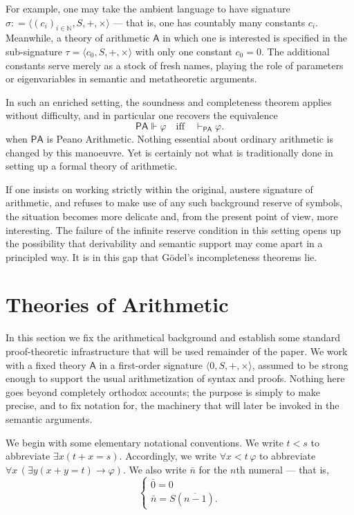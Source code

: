 \documentclass[reqno]{asl}
\newcommand{\supp}{\Vdash}
\newcommand{\pa}{\textsf{A}}
\begin{document}
For example, one may take the ambient language to have signature $\sigma: = \langle (c_i)_{i\in \mathbb{N}}, S, +, \times \rangle$ --- that is, one has countably many constants $c_i$.  Meanwhile, a theory of arithmetic $\pa$ in which one is interested is specified in the sub-signature $\tau = \langle c_0, S, +, \times \rangle$ with only one constant $c_0=0$. The additional constants serve merely as a stock of fresh names, playing the role of parameters or eigenvariables in semantic and metatheoretic arguments. 

In such an enriched setting, the soundness and completeness theorem applies without difficulty, and in particular one recovers the equivalence
\[
\mathsf{PA} \supp \varphi \quad \text{iff} \quad \vdash_{\mathsf{PA}} \varphi.
\]
when $\mathsf{PA}$ is Peano Arithmetic. 
Nothing essential about ordinary arithmetic is changed by this manoeuvre. Yet is certainly not what is traditionally done in setting up a formal theory of arithmetic. 

If one insists on working strictly within the original, austere signature of arithmetic, and refuses to make use of any such background reserve of symbols, the situation becomes more delicate and, from the present point of view, more interesting. The failure of the infinite reserve condition in this setting opens up the possibility that derivability and semantic support may come apart in a principled way. It is in this gap that G\"odel's incompleteness theorems lie.

\section{Theories of Arithmetic} \label{sec:theories}

In this section we fix the arithmetical background and establish some standard proof-theoretic infrastructure that will be used remainder of the paper. We work with a fixed theory $\pa$ in a first-order signature  $\langle 0, S, +, \times \rangle$, assumed to be strong enough to support the usual arithmetization of syntax and proofs. Nothing here goes beyond completely orthodox accounts; the purpose is simply to make precise, and to fix notation for, the machinery that will later be invoked in the semantic arguments.

We begin with some elementary notational conventions. We write $t<s$ to abbreviate $\exists x(t+x = s)$. Accordingly, we write $\forall x<t\,\varphi$ to abbreviate $\forall x\,(\exists y(x+y=t) \to \varphi)$. We also write $\bar{n}$ for the $n$th numeral --- that is, 
\[
\begin{cases}
    \bar{0}=0 \\
    \bar{n} = S(\overline{n-1}).
\end{cases}
\]
\end{document}
